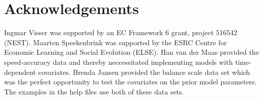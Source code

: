\documentclass[article]{jss}
\begin{document}
\section*{Acknowledgements} 

Ingmar Visser was supported by an EC Framework 6 grant, project 516542
(NEST).  Maarten Speekenbrink was supported by the ESRC Centre for
Economic Learning and Social Evolution (ELSE).  Han van der Maas
provided the speed-accuracy data \cite{Dutilh2009} and thereby
neccessitated implementing models with time-dependent covariates.
Brenda Jansen provided the balance scale data set \citep{Jansen2002}
which was the perfect opportunity to test the covariates on the prior
model parameters.  The examples in the help files use both of these
data sets.


\end{document}
